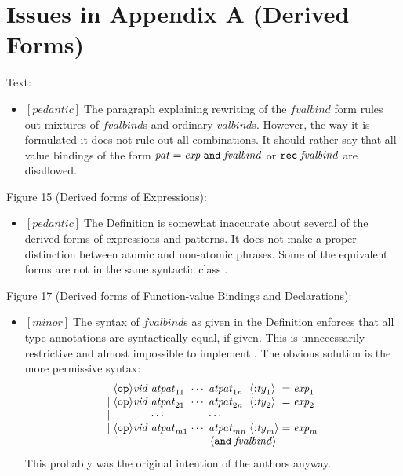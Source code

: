 \documentclass{article}
\newcommand{\m}[1]{$[\mathit{#1}]\;$}
\newcommand{\minor}{\m{minor}}
\newcommand{\pedantic}{\m{pedantic}}
\begin{document}
\section{Issues in Appendix A (Derived Forms)}
\label{bugsappendixa}

Text:
\nopagebreak

\begin{itemize}
\item \pedantic The paragraph explaining rewriting of the $\mathit{fvalbind}$ form rules out mixtures of $\mathit{fvalbind}$s and ordinary $\mathit{valbind}$s. However, the way it is formulated it does not rule out all combinations. It should rather say that all value bindings of the form $\mathit{pat}\;{\tt=}\;\mathit{exp}\;{\tt and}\;\mathit{fvalbind}$ or ${\tt rec}\;\mathit{fvalbind}$ are disallowed.
\end{itemize}


Figure 15 (Derived forms of Expressions):
\nopagebreak

\begin{itemize}
\item \pedantic The Definition is somewhat inaccurate about several of the derived forms of expressions and patterns. It does not make a proper distinction between atomic and non-atomic phrases. Some of the equivalent forms are not in the same syntactic class \cite{commentary, mistakes}.
\end{itemize}


Figure 17 (Derived forms of Function-value Bindings and Declarations):
\nopagebreak

\begin{itemize}
\item \minor The syntax of $\mathit{fvalbind}$s as given in the Definition enforces that all type annotations are syntactically equal, if given. This is unnecessarily restrictive and almost impossible to implement \cite{mistakes}. The obvious solution is the more permissive syntax:
\begin{displaymath}
\begin{array}{l@{\;}l@{\;}l@{\;}l@{\;}l@{\;}l@{\;}l@{\;}l}
& \langle{\tt{op}}\rangle\mathit{vid} & \mathit{atpat}_{11} & \cdots & \mathit{atpat}_{1n} & \langle{\tt:}\mathit{ty}_1\rangle &{\tt =}& \mathit{exp}_1 \\
{\tt|} & \langle{\tt{op}}\rangle\mathit{vid} & \mathit{atpat}_{21} & \cdots & \mathit{atpat}_{2n} & \langle{\tt:}\mathit{ty}_2\rangle &{\tt =}& \mathit{exp}_2 \\
{\tt|} & & \cdots & & \cdots \\
{\tt|} & \langle{\tt{op}}\rangle\mathit{vid} & \mathit{atpat}_{m1} & \cdots & \mathit{atpat}_{mn} & \langle{\tt:}\mathit{ty}_m\rangle &{\tt =}& \mathit{exp}_m \\
\multicolumn{6}{r}{\langle {\tt and} \; \mathit{fvalbind} \rangle}
\end{array}
\end{displaymath}
This probably was the original intention of the authors anyway.
\end{itemize}
\end{document}

